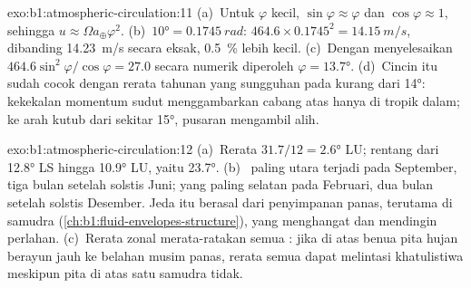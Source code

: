 \begin{solution}{exo:b1:atmospheric-circulation:11}
(a)~Untuk $\varphi$ kecil, $\sin\varphi \approx \varphi$ dan $\cos\varphi \approx 1$,
sehingga $u \approx \Omega a_\oplus\varphi^2$. (b)~$\ang{10} = \qty{0.1745}{rad}$:
$464.6 \times 0.1745^2 = \qty{14.15}{m/s}$, dibanding \qty{14.23}{m/s} secara eksak,
\qty{0.5}{\percent} lebih kecil. (c)~Dengan menyelesaikan $464.6\sin^2\varphi/\cos\varphi = 27.0$
secara numerik diperoleh $\varphi = \ang{13.7}$. (d)~Cincin itu sudah cocok dengan 
rerata tahunan yang sungguhan pada kurang dari \ang{14}: kekekalan momentum sudut menggambarkan cabang atas  hanya di tropik dalam; ke arah kutub dari sekitar
\ang{15}, pusaran mengambil alih.
\end{solution}

\begin{solution}{exo:b1:atmospheric-circulation:12}
(a)~Rerata $31.7/12 = \ang{2.6}$ LU; rentang dari \ang{12.8} LS hingga \ang{10.9} LU, yaitu
\ang{23.7}. (b)~ paling utara terjadi pada September, tiga bulan setelah
solstis Juni; yang paling selatan pada Februari, dua bulan setelah solstis Desember.
Jeda itu berasal dari penyimpanan panas, terutama di  samudra
(\cref{ch:b1:fluid-envelopes-structure}), yang menghangat dan mendingin perlahan. (c)~Rerata zonal
merata-ratakan semua : jika di atas benua pita hujan berayun jauh
ke belahan musim panas, rerata semua  dapat melintasi khatulistiwa meskipun pita di atas satu samudra tidak.
\end{solution}

